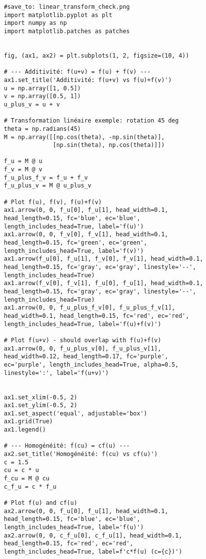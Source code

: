 \documentclass{article}
\begin{document}
\begin{figure}[H]
    \centering
    \begin{verbatim}
#save_to: linear_transform_check.png
import matplotlib.pyplot as plt
import numpy as np
import matplotlib.patches as patches


fig, (ax1, ax2) = plt.subplots(1, 2, figsize=(10, 4))

# --- Additivité: f(u+v) = f(u) + f(v) ---
ax1.set_title('Additivité: f(u+v) vs f(u)+f(v)')
u = np.array([1, 0.5])
v = np.array([0.5, 1])
u_plus_v = u + v

# Transformation linéaire exemple: rotation 45 deg
theta = np.radians(45)
M = np.array([[np.cos(theta), -np.sin(theta)],
              [np.sin(theta), np.cos(theta)]])

f_u = M @ u
f_v = M @ v
f_u_plus_f_v = f_u + f_v
f_u_plus_v = M @ u_plus_v

# Plot f(u), f(v), f(u)+f(v)
ax1.arrow(0, 0, f_u[0], f_u[1], head_width=0.1, head_length=0.15, fc='blue', ec='blue', length_includes_head=True, label='f(u)')
ax1.arrow(0, 0, f_v[0], f_v[1], head_width=0.1, head_length=0.15, fc='green', ec='green', length_includes_head=True, label='f(v)')
ax1.arrow(f_u[0], f_u[1], f_v[0], f_v[1], head_width=0.1, head_length=0.15, fc='gray', ec='gray', linestyle='--', length_includes_head=True)
ax1.arrow(f_v[0], f_v[1], f_u[0], f_u[1], head_width=0.1, head_length=0.15, fc='gray', ec='gray', linestyle='--', length_includes_head=True)
ax1.arrow(0, 0, f_u_plus_f_v[0], f_u_plus_f_v[1], head_width=0.1, head_length=0.15, fc='red', ec='red', length_includes_head=True, label='f(u)+f(v)')

# Plot f(u+v) - should overlap with f(u)+f(v)
ax1.arrow(0, 0, f_u_plus_v[0], f_u_plus_v[1], head_width=0.12, head_length=0.17, fc='purple', ec='purple', length_includes_head=True, alpha=0.5, linestyle=':', label='f(u+v)')


ax1.set_xlim(-0.5, 2)
ax1.set_ylim(-0.5, 2)
ax1.set_aspect('equal', adjustable='box')
ax1.grid(True)
ax1.legend()

# --- Homogénéité: f(cu) = cf(u) ---
ax2.set_title('Homogénéité: f(cu) vs cf(u)')
c = 1.5
cu = c * u
f_cu = M @ cu
c_f_u = c * f_u

# Plot f(u) and cf(u)
ax2.arrow(0, 0, f_u[0], f_u[1], head_width=0.1, head_length=0.15, fc='blue', ec='blue', length_includes_head=True, label='f(u)')
ax2.arrow(0, 0, c_f_u[0], c_f_u[1], head_width=0.1, head_length=0.15, fc='red', ec='red', length_includes_head=True, label=f'c*f(u) (c={c})')


\end{verbatim}
\end{figure}
\end{document}
